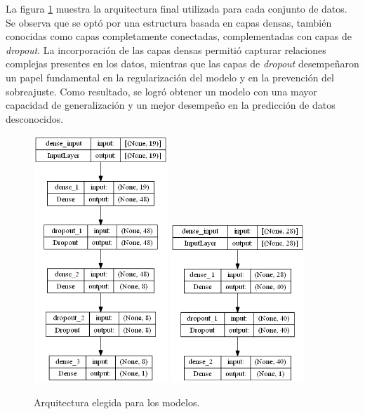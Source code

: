 La figura \ref{fig:arquitectura_datasets} muestra la arquitectura final utilizada para cada conjunto de datos. 
Se observa que se optó por una estructura basada en capas densas, también conocidas como capas 
completamente conectadas, complementadas con capas de \emph{dropout}. La incorporación de las capas 
densas permitió capturar relaciones complejas presentes en los datos, mientras que las capas de 
\emph{dropout} desempeñaron un papel fundamental en la regularización del modelo y en la prevención 
del sobreajuste. Como resultado, se logró obtener un modelo con una mayor capacidad de generalización 
y un mejor desempeño en la predicción de datos desconocidos.


\begin{figure}[H]
	\centering
	\hspace{1em}
	{\includegraphics[width=0.45\textwidth]{./Figures/arquitectura_dataset1.png}}
	\hspace{1em}
	{\includegraphics[width=0.45\textwidth]{./Figures/arquitectura_dataset2.png}}
	\caption{Arquitectura elegida para los modelos.}\label{fig:arquitectura_datasets}
\end{figure}

